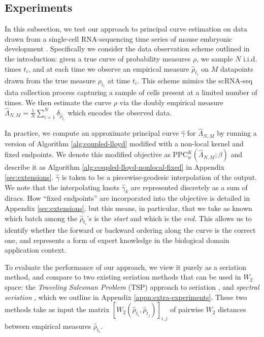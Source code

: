 \documentclass[aos, preprint]{imsart}
\theoremstyle{plain}
\theoremstyle{remark}
\begin{document}
{\subsection{Experiments}
\label{sec:experiments}
In this subsection, we test our approach to principal curve estimation on data drawn from a single-cell RNA-sequencing time series of mouse embryonic development \cite{mouse_time_series}. Specifically we consider the data observation scheme outlined in the introduction: given a true curve of probability measures $\rho$, we sample $N$ i.i.d. times $t_i$, and at each time we observe an empirical measure $\hat\rho_{t_i}$ on $M$ datapoints drawn from the true measure $\rho_{t_i}$ at time $t_i$. This scheme mimics the scRNA-seq data collection process capturing a sample of cells present at a limited number of times. We then estimate the curve $\rho$ via the doubly empirical measure $\hat\Lambda_{N,M}=\frac{1}{N}\sum_{i=1}^N\delta_{\hat\rho_{t_i}}$ which encodes the observed data.

In practice, we compute an approximate principal curve $\hat\gamma$
for $\hat\Lambda_{N,M}$ by running a version of Algorithm
\ref{alg:coupled-lloyd} modified with a non-local kernel and fixed
endpoints. We denote this modified objective as
$\text{PPC}_{w}^{K}(\hat\Lambda_{N,M};\beta)$ and describe it as
Algorithm \ref{alg:coupled-lloyd-nonlocal-fixed} in Appendix
\ref{sec:extensions}. $\hat\gamma$ is taken to be a piecewise-geodesic
interpolation of the output. We note that the interpolating knots
$\hat{\gamma}_k$ are represented discretely as a sum of diracs. How
``fixed endpoints'' are incorporated into the objective is detailed in Appendix \ref{sec:extensions}, but this means, in particular, that we take as known which batch among the $\hat\rho_{t_i}$'s is the \emph{start} and which is the \emph{end}. This allows us to identify whether the forward or backward ordering along the curve is the correct one, and represents a form of expert knowledge in the biological domain application context.

To evaluate the performance of our approach, we view it purely as a seriation method, and compare to two existing seriation methods that can be used in $W_2$ space: the \emph{Traveling Salesman Problem} (TSP) approach to seriation \cite{LAPORTE1978259_tsp_seriation}, and \emph{spectral seriation} \cite{atkins_spectral_1998, spectral_seriation_fogel_alexandre, natik2021consistencyspectralseriation}, which we outline in Appendix \ref{appn:extra-experiments}. These two methods take as input the matrix $[W_2(\hat\rho_{t_i}, \hat\rho_{t_j})]_{i,j}$ of pairwise $W_2$ distances between empirical measures $\hat\rho_{t_i}$.

}
\end{document}
